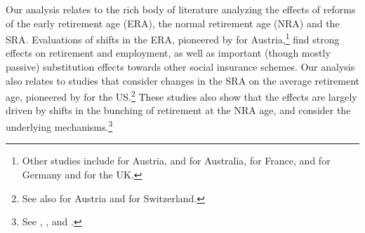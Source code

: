 \documentclass[12pt,a4paper]{article}
\begin{document}
Our analysis relates to the rich body of literature analyzing the effects of reforms of the early retirement age (ERA), the normal retirement age (NRA) and the SRA. 
Evaluations of shifts in the ERA, pioneered by \cite{staubli_does_2013} for Austria,\footnote{Other studies include \cite{manoli_effects_2018} for Austria, \cite{atalay_impact_2015} and \cite{oguzoglu_et_al_2020} for Australia, \cite{rabate_employment_2019} for France, \cite{geyer_closing_2021} and \cite{seibold2019reference} for Germany and \cite{cribb2016signals} for the UK.} find strong effects on retirement and employment, as well as important (though mostly passive)  substitution effects towards other social insurance schemes. Our analysis also relates to studies that consider changes in the SRA on the average retirement age, pioneered by \cite{mastrobuoni_labor_2009} for the US.\footnote{See also \cite{manoli_effects_2018} for Austria and \cite{lalive2019raising} for Switzerland.} These studies also show that the effects are largely driven by shifts in the bunching of retirement at the NRA age, and consider the underlying mechanisms.\footnote{See  \cite{behaghel_framing_2012}, \cite{Brown2013}, \cite{lalive2019raising} and \cite{seibold2019reference}.} 


\end{document}
